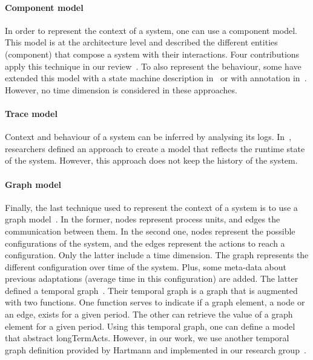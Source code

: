\paragraph{Component model}
In order to represent the context of a system, one can use a component model.
This model is at the architecture level and described the different entities (component) that compose a system with their interactions.
Four contributions apply this technique in our review~\cite{DBLP:conf/soco/DavidL06, DBLP:conf/wetice/DjoudiBZ14, DBLP:journals/computer/GarlanCHSS04, DBLP:conf/cbse/FouquetMFBPJ12}.
To also represent the behaviour, some have extended this model with a state machine description in~\cite{DBLP:conf/wetice/DjoudiBZ14} or with annotation in~\cite{DBLP:journals/computer/GarlanCHSS04}.
However, no time dimension is considered in these approaches.

\paragraph{Trace model}
Context and behaviour of a system can be inferred by analysing its logs.
In~\cite{DBLP:journals/computer/Maoz09}, researchers defined an approach to create a model that reflects the runtime state of the system.
However, this approach does not keep the history of the system.
	
\paragraph{Graph model}
Finally, the last technique used to represent the context of a system is to use a graph model~\cite{DBLP:journals/tse/KramerM90, DBLP:journals/computer/GeorgasHT09, DBLP:conf/dbpl/MoffittS17}.
In the former, nodes represent process units, and edges the communication between them.
In the second one, nodes represent the possible configurations of the system, and the edges represent the actions to reach a configuration.
Only the latter include a time dimension.
The graph represents the different configuration over time of the system.
Plus, some meta-data about previous adaptations (\eg average time in this configuration) are added.
The latter defined a temporal graph~\cite{DBLP:conf/dbpl/MoffittS17}.
Their temporal graph is a graph that is augmented with two functions.
One function serves to indicate if a graph element, a node or an edge, exists for a given period.
The other can retrieve the value of a graph element for a given period.
Using this temporal graph, one can define a model that abstract \glspl{longTermAct}.
However, in our work, we use another temporal graph definition provided by Hartmann \etal and implemented in our research group~\cite{DBLP:journals/is/HartmannFMRT19}.

